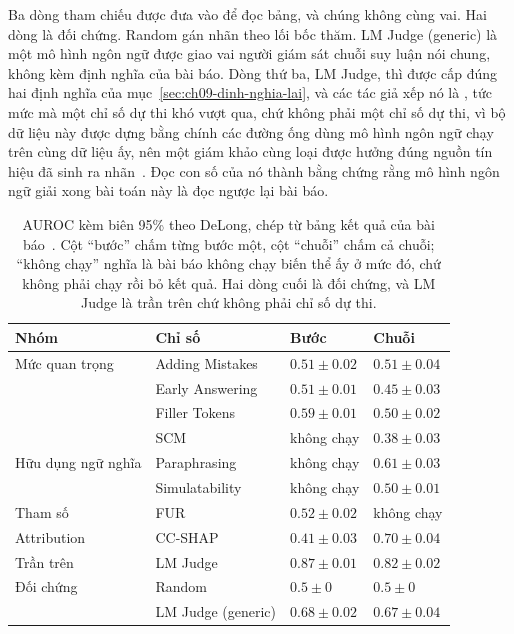 Ba dòng tham chiếu được đưa vào để đọc bảng, và chúng không cùng vai. Hai dòng
là đối chứng. Random gán nhãn theo lối bốc thăm. LM Judge (generic) là một mô
hình ngôn ngữ được giao vai người giám sát chuỗi suy luận nói chung, không kèm
định nghĩa của bài báo. Dòng thứ ba, LM Judge, thì được cấp đúng hai định nghĩa của
mục~\ref{sec:ch09-dinh-nghia-lai}, và các tác giả xếp nó là
, tức mức mà một chỉ số dự thi khó vượt qua, chứ không
phải một chỉ số dự thi, vì bộ dữ liệu này được dựng bằng chính các đường ống
dùng mô hình ngôn ngữ chạy trên cùng dữ liệu ấy, nên một giám khảo cùng loại
được hưởng đúng nguồn tín hiệu đã sinh ra nhãn~\autocite{p21metrics}. Đọc con
số của nó thành bằng chứng rằng mô hình ngôn ngữ giải xong bài toán này là đọc
ngược lại bài báo.

\begin{table}[htbp]
  \centering
  \footnotesize
  \caption{AUROC kèm biên 95\% theo DeLong, chép từ bảng kết quả của bài
  báo~\autocite{p21metrics}. Cột \enquote{bước} chấm từng bước một, cột
  \enquote{chuỗi} chấm cả chuỗi; \enquote{không chạy} nghĩa là bài báo không
  chạy biến thể ấy ở mức đó, chứ không phải chạy rồi bỏ kết quả. Hai dòng cuối
  là đối chứng, và LM Judge là trần trên chứ không phải chỉ số dự thi.}
  \label{tab:ch09-auroc}
  \begin{tabular}{@{}llll@{}}
    \toprule
    Nhóm & Chỉ số & Bước & Chuỗi \\
    \midrule
    Mức quan trọng & Adding Mistakes & $0.51 \pm 0.02$ & $0.51 \pm 0.04$ \\
                   & Early Answering & $0.51 \pm 0.01$ & $0.45 \pm 0.03$ \\
                   & Filler Tokens   & $0.59 \pm 0.01$ & $0.50 \pm 0.02$ \\
                   & SCM             & không chạy      & $0.38 \pm 0.03$ \\
    \addlinespace
    Hữu dụng ngữ nghĩa & Paraphrasing    & không chạy & $0.61 \pm 0.03$ \\
                       & Simulatability  & không chạy & $0.50 \pm 0.01$ \\
    \addlinespace
    Tham số     & FUR     & $0.52 \pm 0.02$ & không chạy \\
    Attribution & CC-SHAP & $0.41 \pm 0.03$ & $0.70 \pm 0.04$ \\
    \midrule
    Trần trên & LM Judge           & $0.87 \pm 0.01$ & $0.82 \pm 0.02$ \\
    Đối chứng & Random             & $0.5 \pm 0$     & $0.5 \pm 0$ \\
              & LM Judge (generic) & $0.68 \pm 0.02$ & $0.67 \pm 0.04$ \\
    \bottomrule
  \end{tabular}
\end{table}

